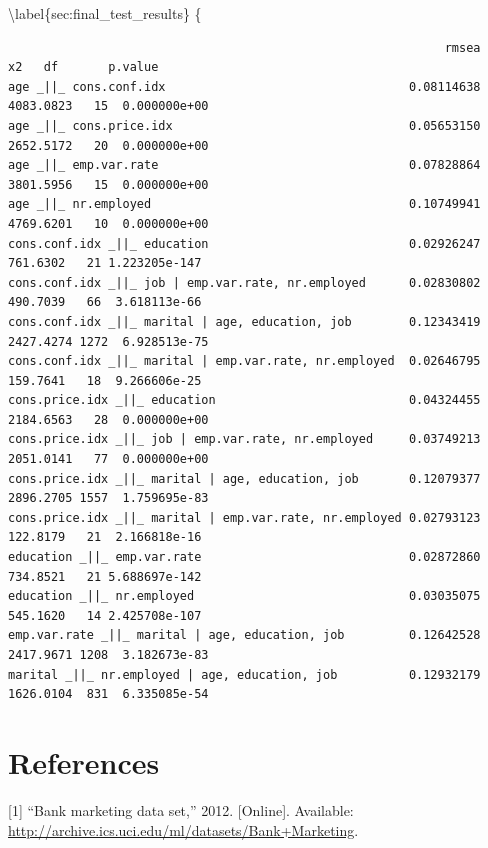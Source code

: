 \documentclass[11pt,]{article}
\begin{document}
\textbackslash{}label\{sec:final\_test\_results\} \{\tiny

\begin{verbatim}
                                                             rmsea        x2   df       p.value
age _||_ cons.conf.idx                                  0.08114638 4083.0823   15  0.000000e+00
age _||_ cons.price.idx                                 0.05653150 2652.5172   20  0.000000e+00
age _||_ emp.var.rate                                   0.07828864 3801.5956   15  0.000000e+00
age _||_ nr.employed                                    0.10749941 4769.6201   10  0.000000e+00
cons.conf.idx _||_ education                            0.02926247  761.6302   21 1.223205e-147
cons.conf.idx _||_ job | emp.var.rate, nr.employed      0.02830802  490.7039   66  3.618113e-66
cons.conf.idx _||_ marital | age, education, job        0.12343419 2427.4274 1272  6.928513e-75
cons.conf.idx _||_ marital | emp.var.rate, nr.employed  0.02646795  159.7641   18  9.266606e-25
cons.price.idx _||_ education                           0.04324455 2184.6563   28  0.000000e+00
cons.price.idx _||_ job | emp.var.rate, nr.employed     0.03749213 2051.0141   77  0.000000e+00
cons.price.idx _||_ marital | age, education, job       0.12079377 2896.2705 1557  1.759695e-83
cons.price.idx _||_ marital | emp.var.rate, nr.employed 0.02793123  122.8179   21  2.166818e-16
education _||_ emp.var.rate                             0.02872860  734.8521   21 5.688697e-142
education _||_ nr.employed                              0.03035075  545.1620   14 2.425708e-107
emp.var.rate _||_ marital | age, education, job         0.12642528 2417.9671 1208  3.182673e-83
marital _||_ nr.employed | age, education, job          0.12932179 1626.0104  831  6.335085e-54
\end{verbatim}

\hypertarget{references}{%
\section*{References}\label{references}}

\hypertarget{refs}{}
\leavevmode\hypertarget{ref-dataset}{}%
{[}1{]} ``Bank marketing data set,'' 2012. {[}Online{]}. Available:
\url{http://archive.ics.uci.edu/ml/datasets/Bank+Marketing}.
\end{document}
